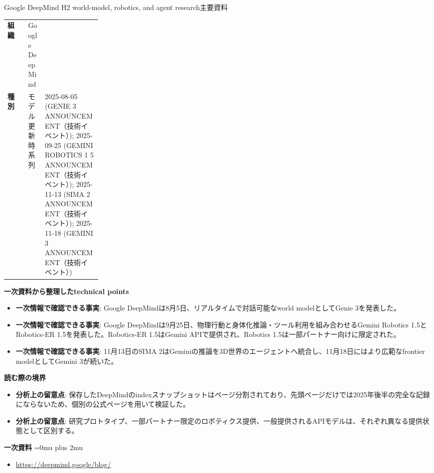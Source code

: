 \begin{technicalnote}{Google DeepMind H2 world-model, robotics, and agent research}{主要資料}
\begingroup
\begin{tabularx}{\linewidth}{@{}>{\bfseries}p{0.22\linewidth}X@{}}
組織 & Google DeepMind \\
種別 & モデル更新
時系列 & 2025-08-05 (GENIE 3 ANNOUNCEMENT（技術イベント）); 2025-09-25 (GEMINI ROBOTICS 1 5 ANNOUNCEMENT（技術イベント）); 2025-11-13 (SIMA 2 ANNOUNCEMENT（技術イベント）); 2025-11-18 (GEMINI 3 ANNOUNCEMENT（技術イベント）) \\
\end{tabularx}
\smallskip
{\bfseries 一次資料から整理したtechnical points}
\begin{itemize}[leftmargin=1.5em,itemsep=0.35em]
\item \textbf{一次情報で確認できる事実}: Google DeepMindは8月5日、リアルタイムで対話可能なworld modelとしてGenie 3を発表した。
\item \textbf{一次情報で確認できる事実}: Google DeepMindは9月25日、物理行動と身体化推論・ツール利用を組み合わせるGemini Robotics 1.5とRobotics-ER 1.5を発表した。Robotics-ER 1.5はGemini APIで提供され、Robotics 1.5は一部パートナー向けに限定された。
\item \textbf{一次情報で確認できる事実}: 11月13日のSIMA 2はGeminiの推論を3D世界のエージェントへ統合し、11月18日にはより広範なfrontier modelとしてGemini 3が続いた。
\end{itemize}
\begin{minipage}{\linewidth}
{\bfseries 読む際の境界}
\begin{itemize}[leftmargin=1.5em,itemsep=0.35em]
\item \textbf{分析上の留意点}: 保存したDeepMindのindexスナップショットはページ分割されており、先頭ページだけでは2025年後半の完全な記録にならないため、個別の公式ページを用いて検証した。
\item \textbf{分析上の留意点}: 研究プロトタイプ、一部パートナー限定のロボティクス提供、一般提供されるAPIモデルは、それぞれ異なる提供状態として区別する。
\end{itemize}
\begin{samepage}
{\bfseries 一次資料}
\begingroup\sloppy
\Urlmuskip=0mu plus 2mu\relax
\begin{itemize}[leftmargin=1.5em,itemsep=0.25em]
\item {\scriptsize\url{https://deepmind.google/blog/}}
\end{itemize}
\endgroup
\end{samepage}
\end{minipage}
\endgroup
\end{technicalnote}
\medskip

